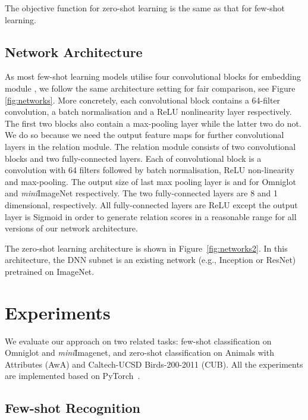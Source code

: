 \documentclass[10pt,twocolumn,letterpaper]{article}
\begin{document}
The objective function for zero-shot learning is the same as that for few-shot learning.


\subsection{Network Architecture}\label{method:architecture}





As most few-shot learning models utilise four convolutional blocks for embedding module \cite{vinyals2016matching, snell2017prototypical}, we follow the same architecture setting for fair comparison, see Figure \ref{fig:networks}.
More concretely, each convolutional block contains a 64-filter  convolution, a batch normalisation and a ReLU nonlinearity layer respectively.  The first two blocks also contain a  max-pooling layer while the latter two do not. We do so because we need the output feature maps for further convolutional layers in the relation module. 
The relation module consists of two convolutional blocks and two fully-connected layers. Each of convolutional block is a   convolution with 64 filters followed by batch normalisation, ReLU non-linearity and  max-pooling. The output size of last max pooling layer is  and  for Omniglot and \textit{mini}ImageNet respectively. The two fully-connected layers are 8 and 1 dimensional, respectively.  
All fully-connected layers are ReLU except the output layer is Sigmoid in order to generate relation scores in a {reasonable} range for all versions of our network architecture. 

The zero-shot learning architecture is shown in Figure~\ref{fig:networks2}. In this architecture, the DNN subnet is an existing network (e.g., Inception or ResNet) pretrained on ImageNet.





\section{Experiments}
We evaluate our approach on two related tasks: few-shot classification on Omniglot and \textit{mini}Imagenet, and zero-shot classification on Animals with Attributes (AwA) and Caltech-UCSD Birds-200-2011 (CUB). All the experiments are implemented based on PyTorch~\cite{PyTorch}.





\subsection{Few-shot Recognition}
\label{sec:exp-few-shot}
\end{document}
